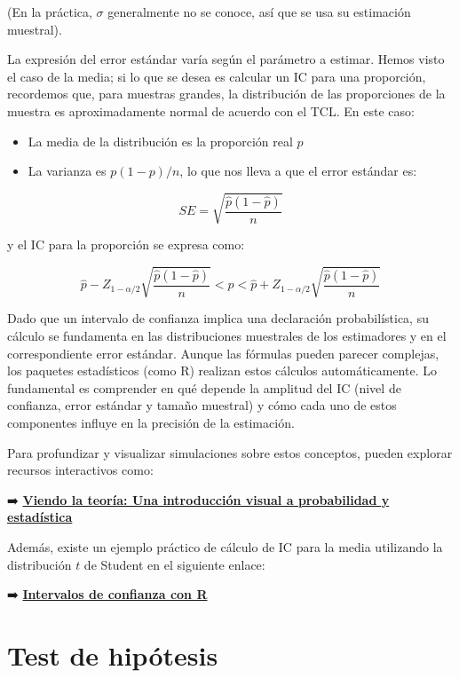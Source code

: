 \documentclass[
  spanish,
  a4paper,
]{scrbook}
\begin{document}
(En la práctica, \(\sigma\) generalmente no se conoce, así que se usa su
estimación muestral).

La expresión del error estándar varía según el parámetro a estimar.
Hemos visto el caso de la media; si lo que se desea es calcular un IC
para una proporción, recordemos que, para muestras grandes, la
distribución de las proporciones de la muestra es aproximadamente normal
de acuerdo con el TCL. En este caso:

\begin{itemize}
\item
  La media de la distribución es la proporción real \(p\)
\item
  La varianza es \(p(1-p)/n\), lo que nos lleva a que el error estándar
  es:
\end{itemize}

\[ 
SE = \sqrt{\frac{\hat{p}(1-\hat{p})}{n}}      
\]

y el IC para la proporción se expresa como:

\[ 
\hat{p} - Z_{1-\alpha/2}\sqrt{\frac{\hat{p}(1-\hat{p})}{n}} < p < \hat{p} + Z_{1-\alpha/2}\sqrt{\frac{\hat{p}(1-\hat{p})}{n}}  
\]

Dado que un intervalo de confianza implica una declaración
probabilística, su cálculo se fundamenta en las distribuciones
muestrales de los estimadores y en el correspondiente error estándar.
Aunque las fórmulas pueden parecer complejas, los paquetes estadísticos
(como R) realizan estos cálculos automáticamente. Lo fundamental es
comprender en qué depende la amplitud del IC (nivel de confianza, error
estándar y tamaño muestral) y cómo cada uno de estos componentes influye
en la precisión de la estimación.

Para profundizar y visualizar simulaciones sobre estos conceptos, pueden
explorar recursos interactivos como:

➡️
\href{https://seeing-theory.brown.edu/frequentist-inference/es.html\#section2}{\textbf{Viendo
la teoría: Una introducción visual a probabilidad y estadística}}

Además, existe un ejemplo práctico de cálculo de IC para la media
utilizando la distribución \(t\) de Student en el siguiente enlace:

➡️
\href{https://cballejo.github.io/R_Epi_Avanzada/Unidad2/IC/}{\textbf{Intervalos
de confianza con R}}

\section{Test de hipótesis}\label{test-de-hipuxf3tesis}
\end{document}
